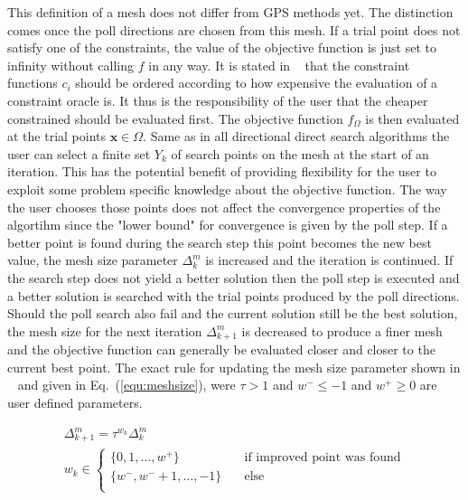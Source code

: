 \documentclass[a4paper,10pt]{article}
\renewcommand{\vec}[1]{\mathbf{#1}}
\newcommand{\equref}[1]{Eq.~(\ref{#1})}
\begin{document}
    This definition of a mesh does not differ from GPS methods yet.
    The distinction comes once the poll directions are chosen from this mesh.
    If a trial point does not satisfy one of the constraints, the value of
    the objective function is just set to infinity without calling $f$ in
    any way.
    It is stated in ~\cite{mads_original} that the constraint functions
    $c_i$ should be ordered according to how expensive the evaluation
    of a constraint oracle is.
    It thus is the responsibility of the user that the cheaper constrained
    should be evaluated first.
    The objective function $f_{\Omega}$ is then evaluated at the trial
    points $\vec{x} \in \Omega$.
    Same as in all directional direct search algorithms the user can
    select a finite set $Y_k$ of search points on the mesh at the
    start of an iteration.
    This has the potential benefit of providing flexibility for the user
    to exploit some problem specific knowledge about the objective
    function.
    The way the user chooses those points does not affect the convergence
    properties of the algortihm since the "lower bound" for convergence
    is given by the poll step.
    If a better point is found during the search step this point becomes
    the new best value, the mesh size parameter $\Delta^m_k$ is increased
    and the iteration is continued.
    If the search step does not yield a better solution then the poll
    step is executed and a better solution is searched with the
    trial points produced by the poll directions.
    Should the poll search also fail and the current solution
    still be the best solution, the mesh size for the next iteration
    $\Delta^m_{k+1}$ is decreased to produce a finer mesh and the
    objective function can generally be evaluated closer and closer
    to the current best point.
    The exact rule for updating the mesh size parameter shown in
    ~\cite{mads_original} and given in \equref{equ:meshsize}, were
    $\tau > 1$ and $w^- \leq -1$ and $w^+ \geq 0$ are user defined
    parameters.

    \begin{equation}
    \label{equ:meshsize}
    \begin{gathered}
    \Delta^m_{k+1} = \tau^{w_k}\Delta^m_k \\
    w_k \in 
    \begin{cases}
        \{ 0,1,\dots,w^+\} &\quad \text{if improved point was found} \\
        \{w^-,w^- + 1,\dots, -1\} &\quad \text{else} \\
    \end{cases}
    \end{gathered}
    \end{equation}
\end{document}
